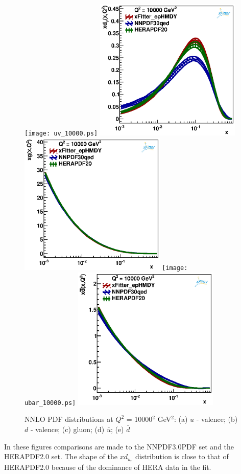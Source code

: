 \begin{figure}
\texttt{[image: uv\_10000.ps]} 
\includegraphics[width=7cm]{dv_10000.ps} 
\includegraphics[width=7cm]{gluon_10000.ps} 
\texttt{[image: ubar\_10000.ps]} 
\includegraphics[width=7cm]{dbar_10000.ps} 
\caption{NNLO PDF distributions at $Q^{2}$ = 10000$^{2}$ GeV$^{2}$: (a) $u$ - valence; (b) $d$ - valence; (c) gluon; (d) $\bar{u}$; (e) $\bar{d}$}
\label{PDF_10000GeV}
\end{figure}
In these figures comparisons are made to the NNPDF3.0PDF set and the HERAPDF2.0 set.
The shape of the $xd_{u_v}$ distribution is close to that of HERAPDF2.0 
because of the dominance of HERA data in the fit. 


